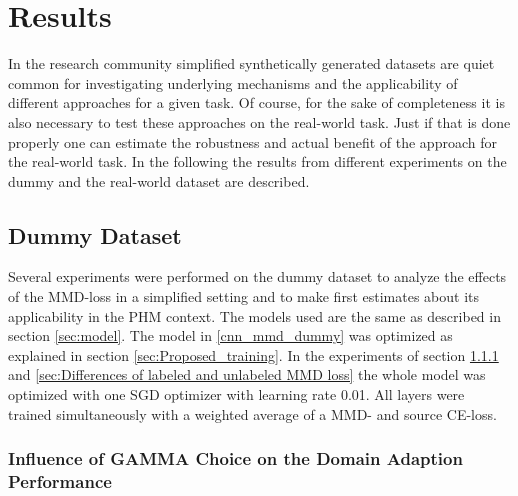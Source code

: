 \chapter{Results}\label{chapter:results}
In the research community simplified synthetically generated datasets are quiet common for investigating underlying mechanisms and the applicability of different approaches for a given task. Of course, for the sake of completeness it is also necessary to test these approaches on the real-world task. Just if that is done properly one can estimate the robustness and actual benefit of the approach for the real-world task. In the following the results from different experiments on the dummy and the real-world dataset are described.

\section{Dummy Dataset}\label{sec:results_dummy_dataset}
Several experiments were performed on the dummy dataset to analyze the effects of the MMD-loss in a simplified setting and to make first estimates about its applicability in the PHM context. The models used are the same as described in section \ref{sec:model}. The model in \ref{cnn_mmd_dummy} was optimized as explained in section \ref{sec:Proposed_training}. In the experiments of section \ref{sec:Balancing Cross-Entropy and MMD loss} and \ref{sec:Differences of labeled and unlabeled MMD loss} the whole model was optimized with one SGD optimizer with learning rate 0.01. All layers were trained simultaneously with a weighted average of a MMD- and source CE-loss.

\subsection{Influence of GAMMA Choice on the Domain Adaption Performance} \label{sec:Balancing Cross-Entropy and MMD loss}


